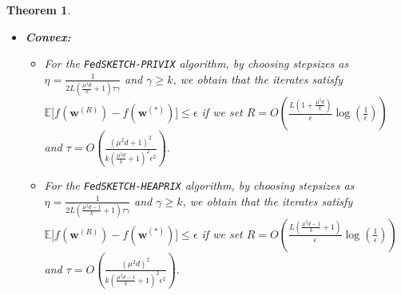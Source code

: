 \documentclass[twoside]{article}
\newtheorem{theorem}{Theorem}
\begin{document}
\begin{theorem}
\begin{itemize}
     \item \textbf{Convex:}
     \begin{itemize}
         \item[1)]For the \texttt{FedSKETCH-PRIVIX} algorithm, by choosing stepsizes as $\eta=\frac{1}{2L\left(\frac{\mu^2d}{k}+1\right)\tau\gamma}$ and $\gamma\geq k$, we obtain that the iterates satisfy $ \mathbb{E}\Big[f({\boldsymbol{w}}^{(R)})-f({\boldsymbol{w}}^{(*)})\Big]\leq \epsilon$ if we set
     $R=O\left(\frac{L\left(1+\frac{\mu^2d}{k}\right)}{\epsilon}\log\left(\frac{1}{\epsilon}\right)\right)$ and $ \tau=O\left(\frac{\left(\mu^2d+1\right)^2}{k\left(\frac{\mu^2d}{k}+1\right)^2\epsilon^2}\right).$
         \item[2)] For the \texttt{FedSKETCH-HEAPRIX} algorithm,
by choosing stepsizes as $\eta=\frac{1}{2L\left(\frac{\mu^2d-1}{k}+1\right)\tau\gamma}$ and $\gamma\geq k$, we obtain that the iterates satisfy $ \mathbb{E}\Big[f({\boldsymbol{w}}^{(R)})-f({\boldsymbol{w}}^{(*)})\Big]\leq \epsilon$ if we set
     $R=O\left(\frac{L\left(\frac{\mu^2d-1}{k}+1\right)}{\epsilon}\log\left(\frac{1}{\epsilon}\right)\right)$ and $ \tau=O\left(\frac{\left(\mu^2d\right)^2}{k\left(\frac{\mu^2d-1}{k}+1\right)^2\epsilon^2}\right).$ 
     \end{itemize}
 \end{itemize}
\end{theorem}
\end{document}
